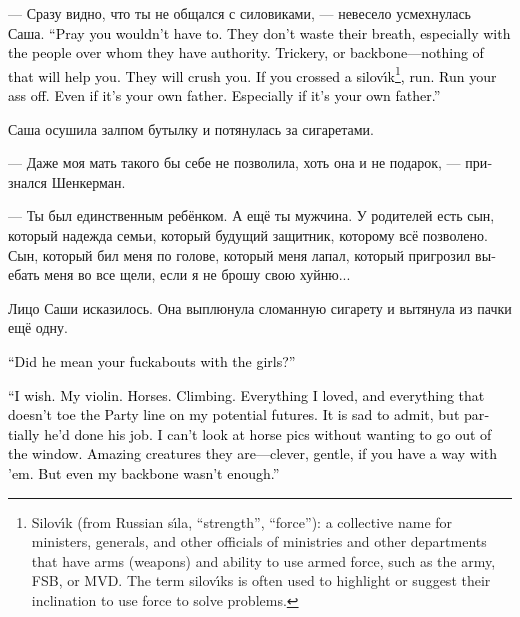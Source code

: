 \documentclass[a5paper,12pt,fleqn]{extbook}\usepackage{cooltooltips}\usepackage{polyglossia}\setdefaultlanguage[babelshorthands=true]{russian}\setotherlanguage{english}\defaultfontfeatures{Ligatures=TeX,Mapping=tex-text} \usepackage{xcolor}\definecolor{lightgray}{HTML}{bbbbbb}\color{lightgray}\newcommand{\ml}[3]{\textenglish{\textcolor{black}{#3}}}
\newcommand{\silovik}{silov\'{\i}k}
\begin{document}
--- Сразу видно, что ты не общался с силовиками, --- невесело усмехнулась Саша.
\ml{$0$}
{--- Молись, чтобы тебе и не пришлось.}
{``Pray you wouldn't have to.}
\ml{$0$}
{Они не бросают слов на ветер, особенно с людьми, над которыми имеют власть.}
{They don't waste their breath, especially with the people over whom they have authority.}
\ml{$0$}
{Не поможет ничего --- ни хитрости, ни характер.}
{Trickery, or backbone---nothing of that will help you.}
\ml{$0$}
{Тебя просто раздавят.}
{They will crush you.}
\ml{$0$}
{Перешёл дорогу силовику --- беги.}
{If you crossed a \silovik\footnote{Silov\'{\i}k (from Russian s\'{\i}la, ``strength'', ``force''): a collective name for ministers, generals, and other officials of ministries and other departments that have arms (weapons) and ability to use armed force, such as the army, FSB, or MVD. The term silov\'{\i}ks is often used to highlight or suggest their inclination to use force to solve problems.}, run.}
\ml{$0$}
{Беги со всех ног.}
{Run your ass off.}
\ml{$0$}
{Даже если это твой родной отец.}
{Even if it's your own father.}
\ml{$0$}
{Тем более если это твой родной отец.}
{Especially if it's your own father.''}

Саша осушила залпом бутылку и потянулась за сигаретами.

--- Даже моя мать такого бы себе не позволила, хоть она и не подарок, --- признался Шенкерман.

--- Ты был единственным ребёнком.
А ещё ты мужчина.
У родителей есть сын, который надежда семьи, который будущий защитник, которому всё позволено.
Сын, который бил меня по голове, который меня лапал, который пригрозил выебать меня во все щели, если я не брошу свою хуйню...

Лицо Саши исказилось.
Она выплюнула сломанную сигарету и вытянула из пачки ещё одну.

\ml{$0$}
{--- Это он про потрахушки с подругами?}
{``Did he mean your fuckabouts with the girls?''}

\ml{$0$}
{--- Если бы.}
{``I wish.}
\ml{$0$}
{Скрипка.}
{My violin.}
\ml{$0$}
{Лошади.}
{Horses.}
\ml{$0$}
{Скалолазание.}
{Climbing.}
\ml{$0$}
{Всё, что я любила, и всё, что не укладывалось в линию партии касательно моего потенциального будущего.}
{Everything I loved, and everything that doesn't toe the Party line on my potential futures.}
\ml{$0$}
{Печально признавать, но частично своё дело он сделал.}
{It is sad to admit, but partially he'd done his job.}
\ml{$0$}
{Я не могу на фотки лошадей теперь смотреть без желания выйти в окно.}
{I can't look at horse pics without wanting to go out of the window.}
\ml{$0$}
{Потрясающие создания --- умные, ласковые, если знать к ним подход.}
{Amazing creatures they are---clever, gentle, if you have a way with 'em.}
\ml{$0$}
{Но даже моего характера не хватило.}
{But even my backbone wasn't enough.''}
\end{document}
